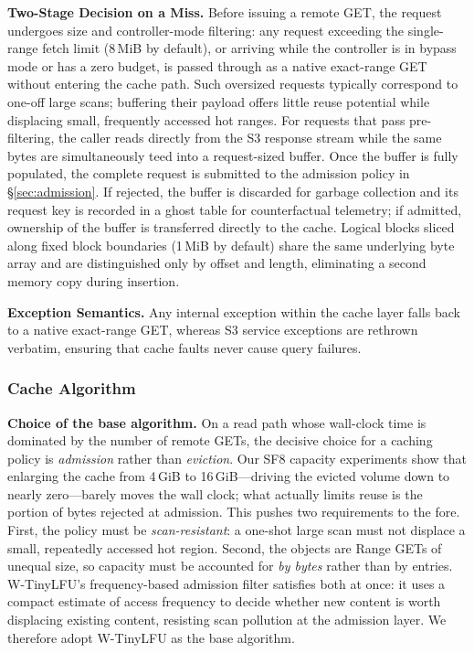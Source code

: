 \noindent\textbf{Two-Stage Decision on a Miss.}
Before issuing a remote GET, the request undergoes size and controller-mode filtering: any request exceeding the single-range fetch limit (8\,MiB by default), or arriving while the controller is in bypass mode or has a zero budget, is passed through as a native exact-range GET without entering the cache path.
Such oversized requests typically correspond to one-off large scans; buffering their payload offers little reuse potential while displacing small, frequently accessed hot ranges.
For requests that pass pre-filtering, the caller reads directly from the S3 response stream while the same bytes are simultaneously teed into a request-sized buffer.
Once the buffer is fully populated, the complete request is submitted to the admission policy in \S\ref{sec:admission}.
If rejected, the buffer is discarded for garbage collection and its request key is recorded in a ghost table for counterfactual telemetry; if admitted, ownership of the buffer is transferred directly to the cache.
Logical blocks sliced along fixed block boundaries (1\,MiB by default) share the same underlying byte array and are distinguished only by offset and length, eliminating a second memory copy during insertion.

\noindent\textbf{Exception Semantics.}
Any internal exception within the cache layer falls back to a native exact-range GET, whereas S3 service exceptions are rethrown verbatim, ensuring that cache faults never cause query failures.
\subsubsection{Cache Algorithm}

\textbf{Choice of the base algorithm.}
On a read path whose wall-clock time is dominated by the number of remote
GETs, the decisive choice for a caching policy is \emph{admission} rather
than \emph{eviction}. Our SF8 capacity experiments show that enlarging the
cache from 4\,GiB to 16\,GiB---driving the evicted volume down to nearly
zero---barely moves the wall clock; what actually limits reuse is the portion
of bytes rejected at admission. This pushes two requirements to the fore.
First, the policy must be \emph{scan-resistant}: a one-shot large scan must
not displace a small, repeatedly accessed hot region. Second, the objects are
Range GETs of unequal size, so capacity must be accounted for \emph{by bytes}
rather than by entries. W-TinyLFU's frequency-based admission filter satisfies
both at once: it uses a compact estimate of access frequency to decide whether
new content is worth displacing existing content, resisting scan pollution at
the admission layer. We therefore adopt W-TinyLFU as the base algorithm.


